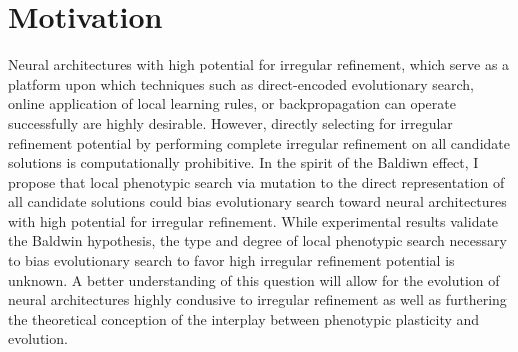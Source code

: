 \section{Motivation}

Neural architectures with high potential for irregular refinement, which serve as a platform upon which techniques such as direct-encoded evolutionary search, online application of local learning rules, or backpropagation can operate successfully are highly desirable. However, directly selecting for irregular refinement potential by performing complete irregular refinement on all candidate solutions is computationally prohibitive. In the spirit of the Baldiwn effect, I propose that local phenotypic search via mutation to the direct representation of all candidate solutions could bias evolutionary search toward neural architectures with high potential for irregular refinement. While experimental results validate the Baldwin hypothesis\cite{Downing2009ComputationalEffect}, the type and degree of local phenotypic search necessary to bias evolutionary search to favor high irregular refinement potential is unknown. A better understanding of this question will allow for the evolution of neural architectures highly condusive to irregular refinement as well as furthering the theoretical conception of the interplay between phenotypic plasticity and evolution.